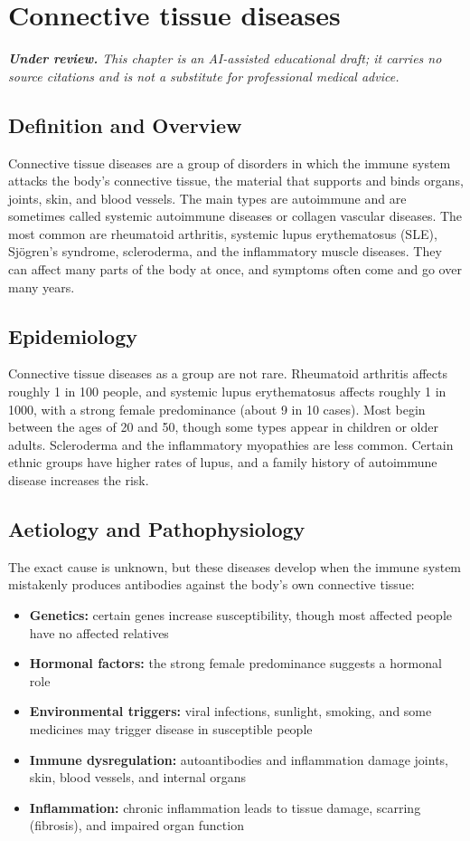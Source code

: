 \chapter{Connective tissue diseases}

\medskip
\noindent\textit{\textbf{Under review.} This chapter is an AI-assisted educational draft; it carries no source citations and is not a substitute for professional medical advice.}

\section*{Definition and Overview}
Connective tissue diseases are a group of disorders in which the immune system attacks the body's connective tissue, the material that supports and binds organs, joints, skin, and blood vessels. The main types are autoimmune and are sometimes called systemic autoimmune diseases or collagen vascular diseases. The most common are rheumatoid arthritis, systemic lupus erythematosus (SLE), Sjögren's syndrome, scleroderma, and the inflammatory muscle diseases. They can affect many parts of the body at once, and symptoms often come and go over many years.

\section*{Epidemiology}
Connective tissue diseases as a group are not rare. Rheumatoid arthritis affects roughly 1 in 100 people, and systemic lupus erythematosus affects roughly 1 in 1000, with a strong female predominance (about 9 in 10 cases). Most begin between the ages of 20 and 50, though some types appear in children or older adults. Scleroderma and the inflammatory myopathies are less common. Certain ethnic groups have higher rates of lupus, and a family history of autoimmune disease increases the risk.

\section*{Aetiology and Pathophysiology}
The exact cause is unknown, but these diseases develop when the immune system mistakenly produces antibodies against the body's own connective tissue:
\begin{itemize}
    \item \textbf{Genetics:} certain genes increase susceptibility, though most affected people have no affected relatives
    \item \textbf{Hormonal factors:} the strong female predominance suggests a hormonal role
    \item \textbf{Environmental triggers:} viral infections, sunlight, smoking, and some medicines may trigger disease in susceptible people
    \item \textbf{Immune dysregulation:} autoantibodies and inflammation damage joints, skin, blood vessels, and internal organs
    \item \textbf{Inflammation:} chronic inflammation leads to tissue damage, scarring (fibrosis), and impaired organ function
\end{itemize}

